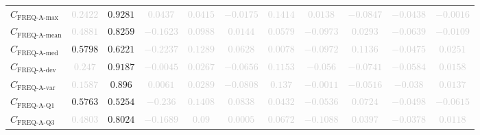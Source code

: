 \documentclass{standalone}
\newcommand{\actfreqmaxname}{\text{FREQ-A-max}}
\newcommand{\actfreqmax}{C_{\actfreqmaxname}}
\newcommand{\actfreqmeanname}{\text{FREQ-A-mean}}
\newcommand{\actfreqmean}{C_{\actfreqmeanname}}
\newcommand{\actfreqmedianname}{\text{FREQ-A-med}}
\newcommand{\actfreqmedian}{C_{\actfreqmedianname}}
\newcommand{\actfreqdevname}{\text{FREQ-A-dev}}
\newcommand{\actfreqdev}{C_{\actfreqdevname}}
\newcommand{\actfreqvarname}{\text{FREQ-A-var}}
\newcommand{\actfreqvar}{C_{\actfreqvarname}}
\newcommand{\actfreqqonename}{\text{FREQ-A-Q1}}
\newcommand{\actfreqqone}{C_{\actfreqqonename}}
\newcommand{\actfreqqthreename}{\text{FREQ-A-Q3}}
\newcommand{\actfreqqthree}{C_{\actfreqqthreename}}
\begin{document}
\begin{tabular}{lcccccccccc}
$\actfreqmax$ & \textcolor{lightgray}{$0.2422$} & $0.9281$ & \textcolor{lightgray}{$0.0437$} & \textcolor{lightgray}{$0.0415$} & \textcolor{lightgray}{$-0.0175$} & \textcolor{lightgray}{$0.1414$} & \textcolor{lightgray}{$0.0138$} & \textcolor{lightgray}{$-0.0847$} & \textcolor{lightgray}{$-0.0438$} & \textcolor{lightgray}{$-0.0016$} \\ 
$\actfreqmean$ & \textcolor{lightgray}{$0.4881$} & $0.8259$ & \textcolor{lightgray}{$-0.1623$} & \textcolor{lightgray}{$0.0988$} & \textcolor{lightgray}{$0.0144$} & \textcolor{lightgray}{$0.0579$} & \textcolor{lightgray}{$-0.0973$} & \textcolor{lightgray}{$0.0293$} & \textcolor{lightgray}{$-0.0639$} & \textcolor{lightgray}{$-0.0109$} \\ 
$\actfreqmedian$ & $0.5798$ & $0.6221$ & \textcolor{lightgray}{$-0.2237$} & \textcolor{lightgray}{$0.1289$} & \textcolor{lightgray}{$0.0628$} & \textcolor{lightgray}{$0.0078$} & \textcolor{lightgray}{$-0.0972$} & \textcolor{lightgray}{$0.1136$} & \textcolor{lightgray}{$-0.0475$} & \textcolor{lightgray}{$0.0251$} \\ 
$\actfreqdev$ & \textcolor{lightgray}{$0.247$} & $0.9187$ & \textcolor{lightgray}{$-0.0045$} & \textcolor{lightgray}{$0.0267$} & \textcolor{lightgray}{$-0.0656$} & \textcolor{lightgray}{$0.1153$} & \textcolor{lightgray}{$-0.056$} & \textcolor{lightgray}{$-0.0741$} & \textcolor{lightgray}{$-0.0584$} & \textcolor{lightgray}{$0.0158$} \\ 
$\actfreqvar$ & \textcolor{lightgray}{$0.1587$} & $0.896$ & \textcolor{lightgray}{$0.0061$} & \textcolor{lightgray}{$0.0289$} & \textcolor{lightgray}{$-0.0808$} & \textcolor{lightgray}{$0.137$} & \textcolor{lightgray}{$-0.0011$} & \textcolor{lightgray}{$-0.0516$} & \textcolor{lightgray}{$-0.038$} & \textcolor{lightgray}{$0.0137$} \\ 
$\actfreqqone$ & $0.5763$ & $0.5254$ & \textcolor{lightgray}{$-0.236$} & \textcolor{lightgray}{$0.1408$} & \textcolor{lightgray}{$0.0838$} & \textcolor{lightgray}{$0.0432$} & \textcolor{lightgray}{$-0.0536$} & \textcolor{lightgray}{$0.0724$} & \textcolor{lightgray}{$-0.0498$} & \textcolor{lightgray}{$-0.0615$} \\ 
$\actfreqqthree$ & \textcolor{lightgray}{$0.4803$} & $0.8024$ & \textcolor{lightgray}{$-0.1689$} & \textcolor{lightgray}{$0.09$} & \textcolor{lightgray}{$0.0005$} & \textcolor{lightgray}{$0.0672$} & \textcolor{lightgray}{$-0.1088$} & \textcolor{lightgray}{$0.0397$} & \textcolor{lightgray}{$-0.0378$} & \textcolor{lightgray}{$0.0118$} \\ 

\end{tabular}
\end{document}
